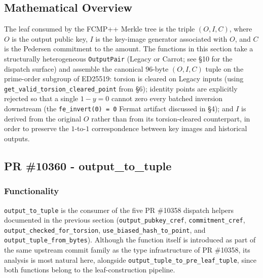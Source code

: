 \documentclass[12pt,titlepage,table]{article}
\begin{document}
\subsection{Mathematical Overview}
The leaf consumed by the FCMP++ Merkle tree is the triple $(O, I, C)$, where $O$ is the output public key, $I$ is the key-image generator associated with $O$, and $C$ is the Pedersen commitment to the amount.  The functions in this section take a structurally heterogeneous \verb+OutputPair+ (Legacy or Carrot; see \S 10 for the dispatch surface) and assemble the canonical $96$-byte $(O,I,C)$ tuple on the prime-order subgroup of ED25519: torsion is cleared on Legacy inputs (using \verb+get_valid_torsion_cleared_point+ from \S 6); identity points are explicitly rejected so that a single $1 - y = 0$ cannot zero every batched inversion downstream (the \verb+fe_invert(0) = 0+ Fermat artifact discussed in \S 4); and $I$ is derived from the original $O$ rather than from its torsion-cleared counterpart, in order to preserve the $1$-to-$1$ correspondence between key images and historical outputs.

\subsection{PR \#10360 - output\_to\_tuple}
\subsubsection{Functionality}
\indent \indent \verb+output_to_tuple+ is the consumer of the five PR \#10358 dispatch helpers documented in the previous section (\verb+output_pubkey_cref+, \verb+commitment_cref+, \verb+output_checked_for_torsion+, \verb+use_biased_hash_to_point+, and \verb+output_tuple_from_bytes+).  Although the function itself is introduced as part of the same upstream commit family as the type infrastructure of PR \#10358, its analysis is most natural here, alongside \verb+output_tuple_to_pre_leaf_tuple+, since both functions belong to the leaf-construction pipeline.


\end{document}
